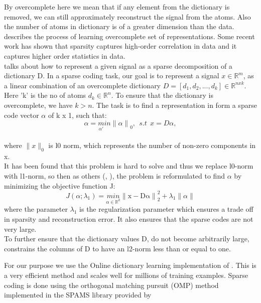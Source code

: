 By overcomplete here we mean that if any element from the dictionary is removed, we can still approximately reconstruct the signal from the atoms. Also the number of atoms in dictionary is of a greater dimension than the data. \citet{lewicki2000learning} describes the process of learning overcomplete set of representations. Some recent work \citep{mairal2009supervised} has shown that sparsity captures high-order correlation in data and it captures higher order statistics in data.\\

\citet{huang2006sparse} talks about how to represent a given signal as a sparse decomposition of a dictionary D. In a sparse coding task, our goal is to represent a signal $x \in \mathbb{R}^m$, as a linear combination of an overcomplete dictionary $D =[d_1,d_2,...,d_k] \in \mathbb{R}^{n x k}$. Here 'k' is the no of atoms $d_k \in \mathbb{R}^n$. To ensure that the dictionary is overcomplete, we have $k > n$. The task is to find a representation in form a sparse code vector $\alpha$ of k x 1, such that:
\begin{equation}\label{eq: sparse coding}
\alpha = \underset{\alpha '}min {\lVert\alpha \rVert}_0 ,\ \ s.t \ \ x = D \alpha , 
\end{equation}
\\
where $\lVert x \rVert_0$ is l0 norm, which represents the number of non-zero components in x.\\

It has been found that this problem is hard to solve and thus we replace l0-norm with l1-norm, so then as others (\citet{lee2006efficient}, \citet{donoho2006compressed}), the problem is reformulated to find $\alpha$ by minimizing the objective function J:
\begin{equation}
J(\alpha; \lambda_1) = \underset{\alpha \in \mathbb{R}^k}{min} {\lVert \mathrm{x-D\alpha} \rVert}^2_2 + \lambda_1 \lVert \alpha \rVert
\end{equation}
where the parameter $\lambda_1$ is the regularization parameter which ensures a trade off in sparsity and reconstruction error. It also ensures that the sparse codes are not very large.\\

To further ensure that the dictionary values D, do not become arbitrarily large, \citet{mairal2009online} constrains the columns of D to have an l2-norm less than or equal to one.

For our purpose we use the Online dictionary learning implementation of \citet{mairal2009online}. This is a very efficient method and scales well for millions of training examples.
Sparse coding is done using the orthogonal matching pursuit (OMP) method  \cite{pati1993orthogonal,tropp2007signal} implemented in the SPAMS library provided by \citet{mairal2010online}


